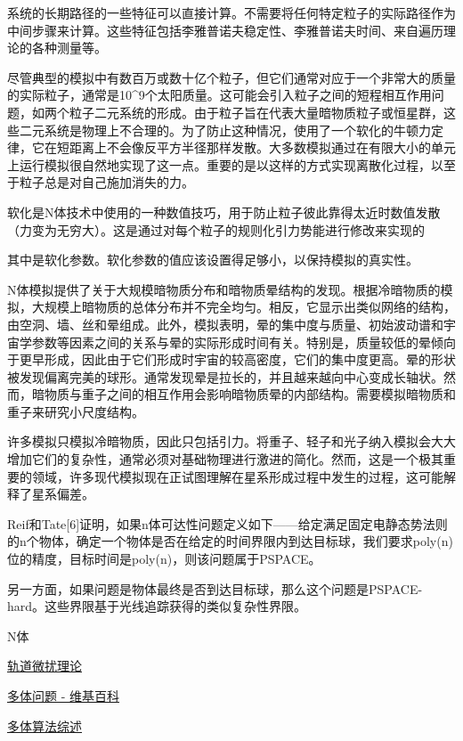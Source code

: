 系统的长期路径的一些特征可以直接计算。不需要将任何特定粒子的实际路径作为中间步骤来计算。这些特征包括李雅普诺夫稳定性、李雅普诺夫时间、来自遍历理论的各种测量等。

尽管典型的模拟中有数百万或数十亿个粒子，但它们通常对应于一个非常大的质量的实际粒子，通常是10^9个太阳质量。这可能会引入粒子之间的短程相互作用问题，如两个粒子二元系统的形成。由于粒子旨在代表大量暗物质粒子或恒星群，这些二元系统是物理上不合理的。为了防止这种情况，使用了一个软化的牛顿力定律，它在短距离上不会像反平方半径那样发散。大多数模拟通过在有限大小的单元上运行模拟很自然地实现了这一点。重要的是以这样的方式实现离散化过程，以至于粒子总是对自己施加消失的力。

软化是N体技术中使用的一种数值技巧，用于防止粒子彼此靠得太近时数值发散（力变为无穷大）。这是通过对每个粒子的规则化引力势能进行修改来实现的

其中是软化参数。软化参数的值应该设置得足够小，以保持模拟的真实性。

N体模拟提供了关于大规模暗物质分布和暗物质晕结构的发现。根据冷暗物质的模拟，大规模上暗物质的总体分布并不完全均匀。相反，它显示出类似网络的结构，由空洞、墙、丝和晕组成。此外，模拟表明，晕的集中度与质量、初始波动谱和宇宙学参数等因素之间的关系与晕的实际形成时间有关。特别是，质量较低的晕倾向于更早形成，因此由于它们形成时宇宙的较高密度，它们的集中度更高。晕的形状被发现偏离完美的球形。通常发现晕是拉长的，并且越来越向中心变成长轴状。然而，暗物质与重子之间的相互作用会影响暗物质晕的内部结构。需要模拟暗物质和重子来研究小尺度结构。

许多模拟只模拟冷暗物质，因此只包括引力。将重子、轻子和光子纳入模拟会大大增加它们的复杂性，通常必须对基础物理进行激进的简化。然而，这是一个极其重要的领域，许多现代模拟现在正试图理解在星系形成过程中发生的过程，这可能解释了星系偏差。

Reif和Tate[6]证明，如果n体可达性问题定义如下——给定满足固定电静态势法则的n个物体，确定一个物体是否在给定的时间界限内到达目标球，我们要求poly(n)位的精度，目标时间是poly(n)，则该问题属于PSPACE。

另一方面，如果问题是物体最终是否到达目标球，那么这个问题是PSPACE-hard。这些界限基于光线追踪获得的类似复杂性界限。

N体 




\href{https://en.wikipedia.org/wiki/Orbit_modeling}{轨道微扰理论}

\href{https://en.wikipedia.org/wiki/N-body_problem}{多体问题 - 维基百科}

\href{https://arxiv.org/abs/0806.3950v1}{多体算法综述}

